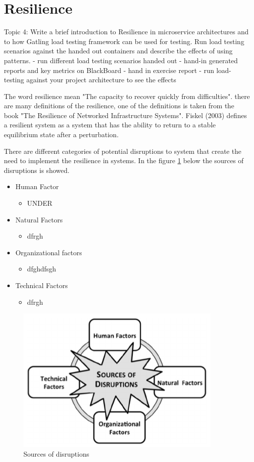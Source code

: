 \chapter{Resilience}\label{ch:resilience}
Topic 4: Write a brief introduction to Resilience in microservice architectures and to how Gatling load testing framework can be used for testing. Run load testing scenarios against the handed out containers and describe the effects of using patterns.
- run different load testing scenarios handed out
- hand-in generated reports and key metrics on BlackBoard 
- hand in exercise report
- run load-testing against your project architecture to see the effects

The word resilience mean "The capacity to recover quickly from difficulties". there are many definitions of the resilience, one of the definitions is taken from the book "The Resilience of Networked Infrastructure Systems". Fiskel (2003) defines a resilient system as a system that has the ability to return to a stable equilibrium state after a perturbation. 

There are different categories of potential disruptions to system that create the need to implement the resilience in systems. In the figure \ref{ch:resilience} below the sources of disruptions is showed. 

\begin{itemize}
	\item Human Factor
	\begin{itemize}
		\item UNDER
	\end{itemize}
	\item Natural Factors
	\begin{itemize}
		\item dfrgh
	\end{itemize}
	\item Organizational factors
	\begin{itemize}
		\item dfghdfsgh
	\end{itemize}
	\item Technical Factors
	\begin{itemize}
		\item dfrgh
	\end{itemize}
	
	
\end{itemize}



\begin{figure}[bth]
	\includegraphics[width=0.7\linewidth]{gfx/resilience}
	\caption[routingtable]{Sources of disruptions} \label{fig:resilience}
\end{figure}   
